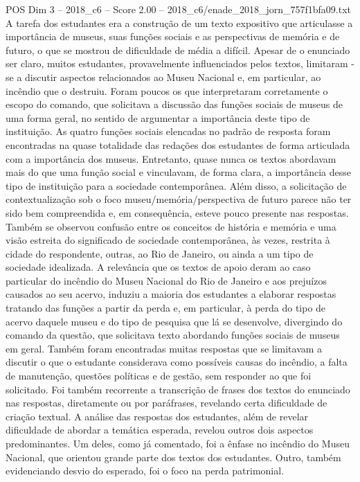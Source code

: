 \begin{textsample}{POS Dim 3 – 2018\_c6 – Score 2.00 – 2018\_c6/enade\_2018\_jorn\_757f1bfa09.txt}
A tarefa dos estudantes era a construção de um texto expositivo que articulasse a importância de museus, suas funções sociais e as perspectivas de memória e de futuro, o que se mostrou de dificuldade de média a difícil.
Apesar de o enunciado ser claro, muitos estudantes, provavelmente influenciados pelos textos, limitaram -se a discutir aspectos relacionados ao Museu Nacional e, em particular, ao incêndio que o destruiu.
Foram poucos os que interpretaram corretamente o escopo do comando, que solicitava a discussão das funções sociais de museus de uma forma geral, no sentido de argumentar a importância deste tipo de instituição.
As quatro funções sociais elencadas no padrão de resposta foram encontradas na quase totalidade das redações dos estudantes de forma articulada com a importância dos museus.
Entretanto, quase nunca os textos abordavam mais do que uma função social e vinculavam, de forma clara, a importância desse tipo de instituição para a sociedade contemporânea.
Além disso, a solicitação de contextualização sob o foco museu/memória/perspectiva de futuro parece não ter sido bem compreendida e, em consequência, esteve pouco presente nas respostas.
Também se observou confusão entre os conceitos de história e memória e uma visão estreita do significado de sociedade contemporânea, às vezes, restrita à cidade do respondente, outras, ao Rio de Janeiro, ou ainda a um tipo de sociedade idealizada.
A relevância que os textos de apoio deram ao caso particular do incêndio do Museu Nacional do Rio de Janeiro e aos prejuízos causados ao seu acervo, induziu a maioria dos estudantes a elaborar respostas tratando das funções a partir da perda e, em particular, à perda do tipo de acervo daquele museu e do tipo de pesquisa que lá se desenvolve, divergindo do comando da questão, que solicitava texto abordando funções sociais de museus em geral.
Também foram encontradas muitas respostas que se limitavam a discutir o que o estudante considerava como possíveis causas do incêndio, a falta de manutenção, questões políticas e de gestão, sem responder ao que foi solicitado.
Foi também recorrente a transcrição de frases dos textos do enunciado nas respostas, diretamente ou por paráfrases, revelando certa dificuldade de criação textual.
A análise das respostas dos estudantes, além de revelar dificuldade de abordar a temática esperada, revelou outros dois aspectos predominantes.
Um deles, como já comentado, foi a ênfase no incêndio do Museu Nacional, que orientou grande parte dos textos dos estudantes.
Outro, também evidenciando desvio do esperado, foi o foco na perda patrimonial.

\end{textsample}
